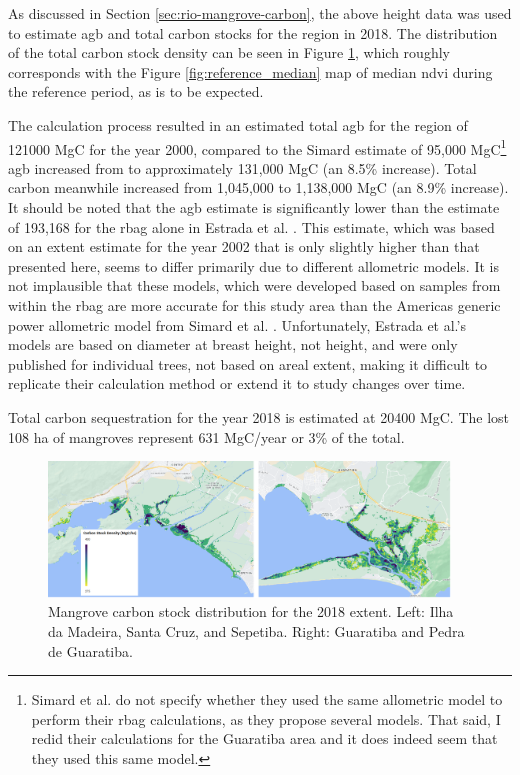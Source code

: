 As discussed in Section \ref{sec:rio-mangrove-carbon}, the above height data was used to estimate \ac{agb} and total carbon stocks for the region in 2018. The distribution of the total carbon stock density can be seen in Figure \ref{fig:carbon_density}, which roughly corresponds with the Figure \ref{fig:reference_median} map of median \ac{ndvi} during the reference period, as is to be expected. 

The calculation process resulted in an estimated total \ac{agb} for the region of 121000 MgC for the year 2000, compared to the Simard estimate of 95,000 MgC\footnote{Simard et al. do not specify whether they used the same allometric model to perform their \ac{rbag} calculations, as they propose several models. That said, I redid their calculations for the Guaratiba area and it does indeed seem that they used this same model.} \ac{agb} increased from to approximately 131,000 MgC (an 8.5\% increase). Total carbon meanwhile increased from 1,045,000 to 1,138,000 MgC (an 8.9\% increase). It should be noted that the \ac{agb} estimate is significantly lower than the estimate of 193,168 for the \ac{rbag} alone in Estrada et al. \cite{estradaEconomicEvaluationCarbon2015}. This estimate, which was based on an extent estimate for the year 2002 that is only slightly higher than that presented here, seems to differ primarily due to different allometric models. It is not implausible that these models, which were developed based on samples from within the \ac{rbag} are more accurate for this study area than the Americas generic power allometric model from Simard et al. \cite{simardMangroveCanopyHeight2019}. Unfortunately, Estrada et al.'s models are based on diameter at breast height, not height, and were only published for individual trees, not based on areal extent, making it difficult to replicate their calculation method or extend it to study changes over time. 

Total carbon sequestration for the year 2018 is estimated at 20400 MgC. The lost 108 ha of mangroves represent 631 MgC/year or 3\% of the total. 

\begin{figure}[!htb] 
\centering
\includegraphics[width=0.95\textwidth]{Figures/chap4/carbon_density.png}
\caption[Mangrove Carbon Stock Distribution]{Mangrove carbon stock distribution for the 2018 extent. Left: Ilha da Madeira, Santa Cruz, and Sepetiba. Right: Guaratiba and Pedra de Guaratiba.}
\label{fig:carbon_density}
\end{figure}


